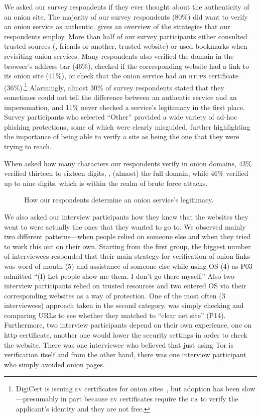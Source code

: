 We asked our survey respondents if they ever thought about the authenticity of
an onion site.  The majority of our survey respondents (80\%) did want to verify
an onion service as authentic.   gives an
overview of the strategies that our respondents employ.  More than half of our
survey participants either consulted trusted sources (\eg, friends or another,
trusted website) or used bookmarks when revisiting onion services.  Many
respondents also verified the domain in the browser's address bar (46\%),
checked if the corresponding website had a link to its onion site (41\%), or
check that the onion service had an \textsc{https} certificate
(36\%).\footnote{DigiCert is issuing \textsc{ev} certificates for onion
sites~\cite{DigiCert2015a}, but adoption has been slow---presumably in part
because \textsc{ev} certificates require the \textsc{ca} to verify the
applicant's identity and they are not free.}  Alarmingly, almost 30\% of survey
respondents stated that they sometimes could not tell the difference between an
authentic service and an impersonation, and 11\% never checked a service's
legitimacy in the first place.  Survey participants who selected ``Other''
provided a wide variety of ad-hoc phishing protections, some of which were
clearly misguided,  further
highlighting the importance of being able to verify a site as being the one that
they were trying to reach.

When asked how many characters our respondents verify in onion domains,  43\%
verified thirteen to sixteen digits, \ie, (almost) the full domain, while 46\%
verified up to nine digits, which is within the realm of brute force attacks.

\begin{figure}[t]
    \centering
    
    \caption{How our respondents determine an onion service's legitimacy.}
    \label{fig:determining-legitimacy}
\end{figure}

We also asked our interview participants how they knew that the websites they
went to were actually the ones that they wanted to go to.  We observed mainly
two different patterns---when people relied on someone else and when they tried
to work this out on their own. Starting from the first group, the biggest number
of interviewees responded that their main strategy for verification of onion
links was word of mouth (5) and assistance of someone else while using OS (4) as
P03 admitted ``(I) Let people show me them. I don't go there myself.''  Also two
interview participants relied on trusted resources and two entered OS via their
corresponding websites as a way of protection. One of the most often (3
interviewees) approach taken in the second category, was simply checking and
comparing URLs to see whether they matched to ``clear net site'' (P14).
Furthermore, two interview participants depend on their own experience, one on
http certificate, another one would lower the security settings in order to
check the website. There was one interviewee who believed that just using Tor is
verification itself and from the other hand, there was one interview participant
who simply avoided onion pages.

